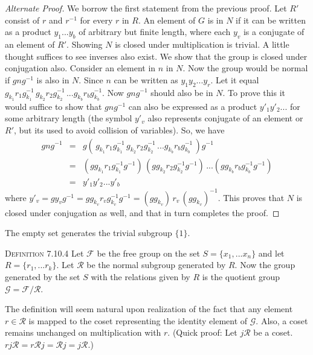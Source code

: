 \documentclass[12pt]{article}
\begin{document}
\begin{proof}[Alternate Proof]
We borrow the first statement from the previous proof. Let $R'$ consist of $r$ and $r^{-1}$ for every $r$ in $R$. An element of $G$ is in $N$ if it can be written as a product $y_{1}...y_{b}$ of arbitrary but finite length, where each $y_{v}$ is a conjugate of an element of $R'$. Showing $N$ is closed under multiplication is trivial. A little thought suffices to see inverses also exist. We show that the group is closed under conjugation also. Consider an element in $n$ in $N$. Now the group would be normal if $gng^{-1}$ is also in $N$. Since $n$ can be written as $y_{1}y_{2}...y_{r}$. Let it equal $g_{k_{1}}r_{1}g_{k_{1}}^{-1}\,g_{k_{2}}r_{2}g_{k_{2}}^{-1}\,...g_{k_{b}}r_{b}g_{k_{b}}^{-1}$. Now $gng^{-1}$ should also be in $N$. To prove this it would suffice to show that $gng^{-1}$ can also be expressed as a product $y'_{1}y'_{2}...$ for some arbitrary length (the symbol $y'_{v}$ also represents conjugate of an element or $R'$, but its used to avoid collision of variables). So, we have
\begin{equation*}
\begin{array}{lcl}
gng^{-1} & = & g(\,g_{k_{1}}r_{1}g_{k_{1}}^{-1}\,g_{k_{2}}r_{2}g_{k_{2}}^{-1}\,...g_{k_{b}}r_{b}g_{k_{b}}^{-1}\,)g^{-1} \\
 & = & (gg_{k_{1}}r_{1}g_{k_{1}}^{-1}g^{-1})\,(gg_{k_{2}}r_{2}g_{k_{2}}^{-1}g^{-1})\,...(gg_{k_{b}}r_{b}g_{k_{b}}^{-1}g^{-1}) \\
 & = & y'_{1}y'_{2}...y'_{b}
\end{array}
\end{equation*}
where $y'_{v}=gy_{v}g^{-1}=gg_{k_{v}}r_{v}g_{k_{v}}^{-1}g^{-1}=(gg_{k_{v}})\,r_{v}\,(gg_{k_{v}})^{-1}$. This proves that $N$ is closed under conjugation as well, and that in turn completes the proof.
\end{proof}
The empty set generates the trivial subgroup $\{1\}$.
\par
\textsc {Definition 7.10.4} Let $\mathcal F$ be the free group on the set $S=\{x_{1},...x_{n}\}$ and let $R=\{r_{1},...r_{k}\}$. Let $\mathcal R$ be the normal subgroup generated by $R$. Now the group generated by the set $S$ with the relations given by $R$ is the quotient group $\mathcal {G = F/R}$.
\par
The definition will seem natural upon realization of the fact that any element $r \in \mathcal R$ is mapped to the coset representing the identity element of $\mathcal G$. Also, a coset remains unchanged on multiplication with $r$. (Quick proof: Let $j\mathcal R$ be a coset. $rj\mathcal R=r\mathcal R j=\mathcal R j=j \mathcal R$.)
\end{document}
